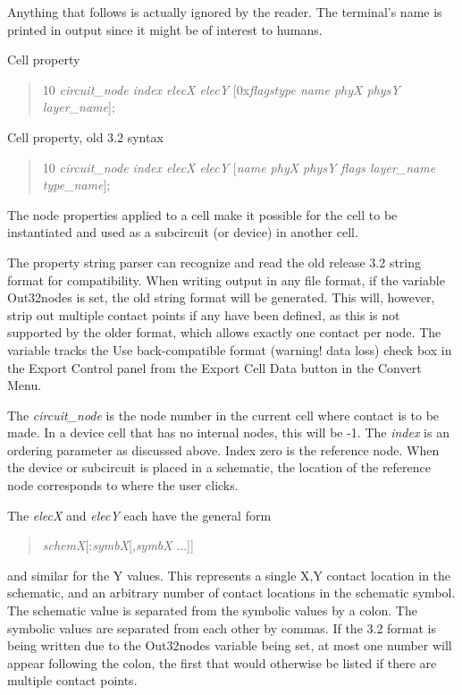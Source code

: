 \begin{description}
Anything that follows is actually ignored by the reader.  The
terminal's name is printed in output since it might be of interest to
humans.

Cell property\\
\begin{quote}{ 10} {\it circuit\_node index elecX elecY\/} [{\vt 0x}{\it flagstype
 name phyX physY layer\_name\/}];
\end{quote}

Cell property, old 3.2 syntax\\
\begin{quote}{ 10} {\it circuit\_node index elecX elecY\/} [{\it name phyX physY
 flags layer\_name type\_name\/}];
\end{quote}

The {\et node} properties applied to a cell make it possible for the
cell to be instantiated and used as a subcircuit (or device) in
another cell.

The property string parser can recognize and read the old release 3.2
string format for compatibility.  When writing output in any file
format, if the variable {\et Out32nodes} is set, the old string format
will be generated.  This will, however, strip out multiple contact
points if any have been defined, as this is not supported by the older
format, which allows exactly one contact per node.  The variable
tracks the {\cb Use back-compatible format (warning!  data loss)}
check box in the {\cb Export Control} panel from the {\cb Export
Cell Data} button in the {\cb Convert Menu}.

The {\it circuit\_node} is the node number in the current cell where
contact is to be made.  In a device cell that has no internal nodes,
this will be -1.  The {\it index} is an ordering parameter as
discussed above.  Index zero is the reference node.  When the device
or subcircuit is placed in a schematic, the location of the reference
node corresponds to where the user clicks.

The {\it elecX} and {\it elecY} each have the general form
\begin{quote}
{\it schemX\/}[{\vt :}{\it symbX\/}[{\vt ,}{\it symbX} ...]]
\end{quote}
and similar for the Y values.  This represents a single X,Y contact
location in the schematic, and an arbitrary number of contact
locations in the schematic symbol.  The schematic value is separated
from the symbolic values by a colon.  The symbolic values are
separated from each other by commas.  If the 3.2 format is being
written due to the {\et Out32nodes} variable being set, at most one
number will appear following the colon, the first that would otherwise
be listed if there are multiple contact points.


\end{description}
